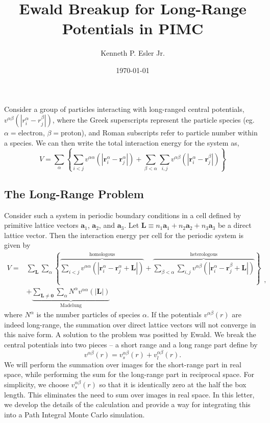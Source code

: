 \documentclass{article}
\title{Ewald Breakup for Long-Range Potentials in PIMC}
\author{Kenneth P. Esler Jr.}
\date{\today}
\begin{document}
\maketitle
Consider a group of particles interacting with long-ranged central
potentials, $v^{\alpha \beta}(|r^{\alpha}_i - r^{\beta}_j|)$, where the Greek superscripts
represent the particle species (eg. $\alpha=\text{electron}$,
$\beta=\text{proton}$), and Roman subscripts refer to particle number
within a species.  We can then write the total interaction energy for
the system as,
\newcommand{\vr}{\mathbf{r}}
\newcommand{\vk}{\mathbf{k}}
\begin{equation}
V = \sum_\alpha \left\{\sum_{i<j} v^{\alpha\alpha}(|\vr^\alpha_i - \vr^\alpha_j|) +
\sum_{\beta<\alpha} 
\sum_{i,j} v^{\alpha \beta}(|\vr^{\alpha}_i - \vr^{\beta}_j|) \right\}
\end{equation}
\newcommand{\va}{\mathbf{a}}
\newcommand{\vb}{\mathbf{b}}
\newcommand{\vL}{\mathbf{L}}
\subsection{The Long-Range Problem}
Consider such a system in periodic boundary conditions in a cell
defined by primitive lattice vectors $\va_1$, $\va_2$, and $\va_3$.
Let $\vL \equiv n_1 \va_1 + n_2 \va_2 + n_3\va_3$ be a direct lattice
vector.  Then the interaction energy per cell for the periodic system
is given by
\begin{equation}
\begin{split}
V = & \sum_\vL \sum_\alpha \left\{ 
\overbrace{\sum_{i<j} v^{\alpha\alpha}(|\vr^\alpha_i - \vr^\alpha_j + \vL|)}^{\text{homologous}} +
\overbrace{\sum_{\beta<\alpha} 
\sum_{i,j} v^{\alpha \beta}(|\vr^{\alpha}_i - \vr^{\beta}_j+\vL|)}^{\text{heterologous}}
\right\}  \\
& + \underbrace{\sum_{\vL \neq \mathbf{0}} \sum_\alpha N^\alpha v^{\alpha \alpha} (|\vL|)}_\text{Madelung}
\end{split}
\label{eq:direct},
\end{equation}
where $N^\alpha$ is the number particles of species $\alpha$.
If the potentials $v^{\alpha\beta}(r)$ are indeed long-range, the
summation over direct lattice vectors will not converge in this naive
form.  A solution to the problem was positted by Ewald.  We break the
central potentials into two pieces -- a short range and a long range
part define by
\begin{equation}
v^{\alpha \beta}(r) = v_s^{\alpha\beta}(r) + v_l^{\alpha \beta}(r).
\end{equation}
We will perform the summation over images for the short-range part in
real space, while performing the sum for the long-range part in
reciprocal space.  For simplicity, we choose $v^{\alpha \beta}_s(r)$
so that it is identically zero at the half the box length.  This
eliminates the need to sum over images in real space. In this letter,
we develop the details of the calculation and provide a way for
integrating this into a Path Integral Monte Carlo simulation.
\end{document}
